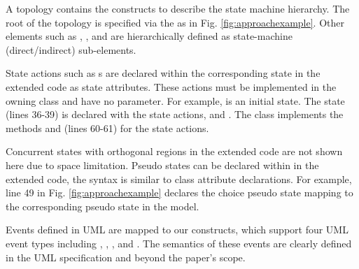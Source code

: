 \noindent
{}
A topology contains the constructs to describe the state machine hierarchy.
The root of the topology is specified via the  as in Fig. \ref{fig:approachexample}.
Other elements such as , , and  are hierarchically defined as state-machine (direct/indirect) sub-elements.

State actions such as s are declared within the corresponding state in the extended code as state attributes.
These actions must be implemented in the owning class and have no parameter.
For example,  is an initial state. 
The  state (lines 36-39) is declared with the state actions,  and . 
The  class implements the methods  and  (lines 60-61) for the state actions.


Concurrent states with orthogonal regions in the extended code are not shown here due to space limitation. 
Pseudo states can be declared within  in the extended code, the syntax is similar to class attribute declarations.
For example, line 49 in Fig. \ref{fig:approachexample} declares the  choice pseudo state mapping to the corresponding pseudo state in the  model.   

\noindent
{}
Events defined in UML are mapped to our constructs, which support four UML event types including , , , and .
The semantics of these events are clearly defined in the UML specification and beyond the paper's scope.

